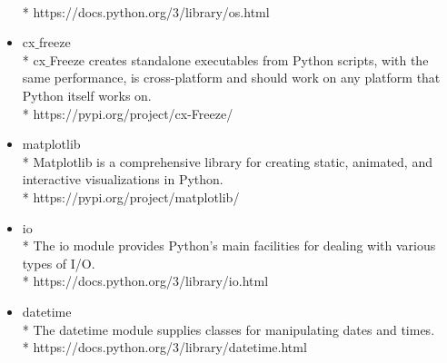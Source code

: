 \begin{itemize}
		\\* https://docs.python.org/3/library/os.html
	\item cx$\_$freeze
		\\* cx$\_$Freeze creates standalone executables from Python scripts, with the same performance, is cross-platform and should work on any platform that Python itself works on. \cite{cxfreeze}
		\\* https://pypi.org/project/cx-Freeze/
	\item matplotlib
		\\* Matplotlib is a comprehensive library for creating static, animated, and interactive visualizations in Python. \cite{matplotlib}
		\\* https://pypi.org/project/matplotlib/
	\item io
		\\* The io module provides Python’s main facilities for dealing with various types of I/O. \cite{io}
		\\* https://docs.python.org/3/library/io.html
	\item datetime
		\\* The datetime module supplies classes for manipulating dates and times. \cite{datetime}
		\\* https://docs.python.org/3/library/datetime.html
\end{itemize}




